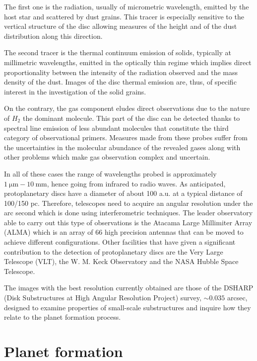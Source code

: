 \documentclass[a4paper,10pt]{report}
\begin{document}
The first one is the radiation, usually of micrometric wavelength, emitted by the host star and scattered by dust grains.
This tracer is especially sensitive to the vertical structure 
of the disc allowing measures of the height and of the dust distribution along this direction.

The second tracer is the thermal continuum emission of solids, typically at millimetric wavelengths,
emitted in the optically thin regime which implies direct proportionality between the intensity of the radiation observed and the
mass density of the dust. Images of the disc thermal emission are, thus, of specific interest in the investigation of the solid grains.

On the contrary, the gas component eludes direct observations due to the nature of $H_2$ the dominant molecule.
This part of the disc can be detected thanks to spectral line emission of less abundant molecules 
that constitute the third category of observational primers. Measures made from these probes suffer from
the uncertainties in the molecular abundance of the revealed gases along with other problems
which make gas observation complex and uncertain.

In all of these cases the range of wavelengths probed is approximately $\SI{1}{\micro\m} - \SI{10}{\mm}$, hence going from infrared to radio waves.
As anticipated, protoplanetary discs have a diameter of about 100 a.u. at a typical distance of 100/150 pc. Therefore, telescopes need to acquire an angular
resolution under the arc second which is done using interferometric techniques. The leader observatory able to carry out this type of observations is the Atacama Large Millimiter Array (ALMA)
which is an array of 66 high precision antennas that can be moved to achieve different configurations. 
Other facilities that have given a significant contribution to the detection of protoplanetary discs are the Very Large Telescope (VLT), the W. M. Keck Observatory and the NASA
Hubble Space Telescope.

The images with the best resolution currently obtained are those of the DSHARP (Disk Substructures at High Angular Resolution Project) survey, $\sim 0.035$ arcsec, designed to examine properties
of small-scale substructures and inquire how they relate to the planet formation process. 

\section{Planet formation}
\end{document}
